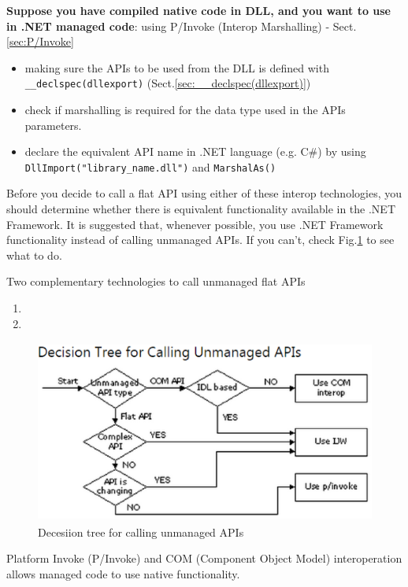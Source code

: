 {\bf Suppose you have compiled native code in DLL, and you want to use in .NET managed code}: using P/Invoke (Interop Marshalling) - Sect.\ref{sec:P/Invoke}
\begin{itemize}
  \item making sure the APIs to be used from the DLL is defined with \verb!__declspec(dllexport)! (Sect.\ref{sec:__declspec(dllexport)})
  
  \item check if marshalling is required for the data type used in the APIs parameters.
  
  \item declare the equivalent API name in .NET language (e.g. C\#) by using \verb!DllImport("library_name.dll")! and \verb!MarshalAs()! 
  
\end{itemize}

Before you decide to call a flat API using either of these interop technologies,
you should determine whether there is equivalent functionality available in the
.NET Framework. It is suggested that, whenever possible, you use .NET Framework
functionality instead of calling unmanaged APIs. If you can't, check
Fig.\ref{fig:how2call_unmanagedAPI} to see what to do.

Two complementary technologies to call unmanaged flat APIs
\begin{enumerate}
  \item 
  \item 
\end{enumerate}

\begin{figure}[hbt]
  \centerline{\includegraphics[height=6cm,
    angle=0]{./images/how2call_unmanagedAPI.eps}}
  \caption{Decesiion tree for calling unmanaged APIs}
  \label{fig:how2call_unmanagedAPI}
\end{figure}


Platform Invoke (P/Invoke) and COM (Component Object Model) interoperation
allows managed code to use native functionality.

